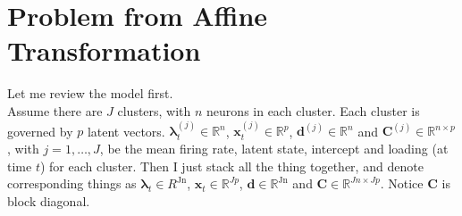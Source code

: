 \documentclass[]{article}
\begin{document}
%
%
%


%
%

\section{Problem from Affine Transformation}
Let me review the model first.\\
Assume there are \(J\)
clusters, with \(n\) neurons in each cluster. Each cluster is governed
by \(p\) latent vectors. \(\bm{\lambda}_{t}^{(j)} \in \mathbb{R}^{n}\),
\(\mathbf{x}_{t}^{(j)} \in \mathbb{R}^{p}\), \(\mathbf{d}^{(j)} \in \mathbb{R}^{n}\) and
\(\mathbf{C}^{(j)} \in \mathbb{R}^{n \times p}\), with \(j = 1,\ldots,J\), be the
mean firing rate, latent state, intercept and loading (at time $t$) for
each cluster. Then I just stack all the thing together, and denote
corresponding things as \(\bm{\lambda}_{t} \in R^{\text{Jn}}\),
\(\mathbf{x}_{t} \in \mathbb{R}^{Jp}\), \(\mathbf{d} \in \mathbb{R}^{\text{Jn}}\)
and \(\mathbf{C} \in \mathbb{R}^{Jn \times Jp}\). Notice \(\mathbf{C}\) is block
diagonal.
\end{document}
